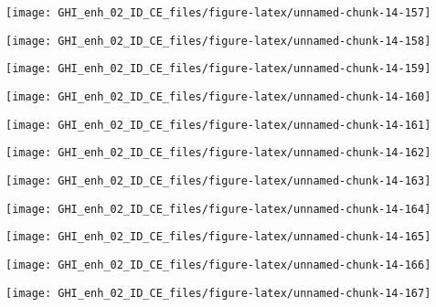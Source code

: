 \documentclass[
  10pt,
  a4paper,oneside]{article}
\begin{document}
\begin{center}\texttt{[image: GHI\_enh\_02\_ID\_CE\_files/figure-latex/unnamed-chunk-14-157]} \end{center}

\begin{center}\texttt{[image: GHI\_enh\_02\_ID\_CE\_files/figure-latex/unnamed-chunk-14-158]} \end{center}

\begin{center}\texttt{[image: GHI\_enh\_02\_ID\_CE\_files/figure-latex/unnamed-chunk-14-159]} \end{center}

\begin{center}\texttt{[image: GHI\_enh\_02\_ID\_CE\_files/figure-latex/unnamed-chunk-14-160]} \end{center}

\begin{center}\texttt{[image: GHI\_enh\_02\_ID\_CE\_files/figure-latex/unnamed-chunk-14-161]} \end{center}

\begin{center}\texttt{[image: GHI\_enh\_02\_ID\_CE\_files/figure-latex/unnamed-chunk-14-162]} \end{center}

\begin{center}\texttt{[image: GHI\_enh\_02\_ID\_CE\_files/figure-latex/unnamed-chunk-14-163]} \end{center}

\begin{center}\texttt{[image: GHI\_enh\_02\_ID\_CE\_files/figure-latex/unnamed-chunk-14-164]} \end{center}

\begin{center}\texttt{[image: GHI\_enh\_02\_ID\_CE\_files/figure-latex/unnamed-chunk-14-165]} \end{center}

\begin{center}\texttt{[image: GHI\_enh\_02\_ID\_CE\_files/figure-latex/unnamed-chunk-14-166]} \end{center}

\begin{center}\texttt{[image: GHI\_enh\_02\_ID\_CE\_files/figure-latex/unnamed-chunk-14-167]} \end{center}
\end{document}
